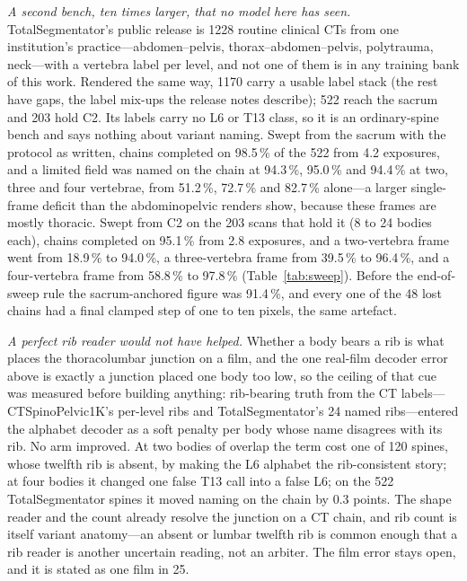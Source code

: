 \documentclass[11pt,letterpaper]{article}
\begin{document}
\emph{A second bench, ten times larger, that no model here has seen.} TotalSegmentator's public release is
1228 routine clinical CTs from one institution's practice---abdomen--pelvis, thorax--abdomen--pelvis,
polytrauma, neck---with a vertebra label per level, and not one of them is in any training bank of this
work. Rendered the same way, 1170 carry a usable label stack (the rest have gaps, the label mix-ups the
release notes describe); 522 reach the sacrum and 203 hold C2. Its labels carry no L6 or T13 class, so it
is an ordinary-spine bench and says nothing about variant naming. Swept from the sacrum with the protocol
as written, chains completed on 98.5\,\% of the 522 from 4.2 exposures, and a limited field was named on
the chain at 94.3\,\%, 95.0\,\% and 94.4\,\% at two, three and four vertebrae, from 51.2\,\%, 72.7\,\% and
82.7\,\% alone---a larger single-frame deficit than the abdominopelvic renders show, because these
frames are mostly thoracic. Swept from C2 on the 203 scans that hold it (8 to 24 bodies each), chains
completed on 95.1\,\% from 2.8 exposures, and a two-vertebra frame went from 18.9\,\% to 94.0\,\%, a
three-vertebra frame from 39.5\,\% to 96.4\,\%, and a four-vertebra frame from 58.8\,\% to 97.8\,\%
(Table~\ref{tab:sweep}). Before the end-of-sweep rule the sacrum-anchored figure was 91.4\,\%, and every
one of the 48 lost chains had a final clamped step of one to ten pixels, the same artefact.

\emph{A perfect rib reader would not have helped.} Whether a body bears a rib is what places the
thoracolumbar junction on a film, and the one real-film decoder error above is exactly a junction placed
one body too low, so the ceiling of that cue was measured before building anything: rib-bearing truth
from the CT labels---CTSpinoPelvic1K's per-level ribs and TotalSegmentator's 24 named ribs---entered the
alphabet decoder as a soft penalty per body whose name disagrees with its rib. No arm improved. At two
bodies of overlap the term cost one of 120 spines, whose twelfth rib is absent, by making the L6 alphabet
the rib-consistent story; at four bodies it changed one false T13 call into a false L6; on the 522
TotalSegmentator spines it moved naming on the chain by 0.3 points. The shape reader and the count
already resolve the junction on a CT chain, and rib count is itself variant anatomy---an absent or
lumbar twelfth rib is common enough that a rib reader is another uncertain reading, not an arbiter. The
film error stays open, and it is stated as one film in 25.
\end{document}
